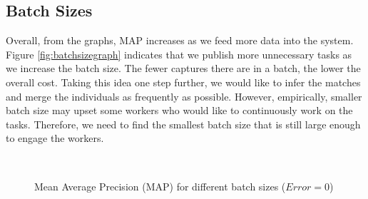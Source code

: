\subsection{Batch Sizes} %
\label{sub:batch_sizes_res}

Overall, from the graphs, MAP increases as we feed more data into the system.
Figure \ref{fig:batchsizegraph} indicates that we publish more unnecessary
tasks as we increase the batch size. The fewer captures there are in a batch,
the lower the overall cost. Taking this idea one step further, we would like to
infer the matches and merge the individuals as frequently as possible. However,
empirically, smaller batch size may upset some workers who would like to
continuously work on the tasks. Therefore, we need to find the smallest batch
size that is still large enough to engage the workers.

\begin{figure}[h!]
  \centering
  \\
  \captionsetup{justification=centering}
  \caption{Mean Average Precision (MAP) for different batch sizes ($Error=0$)}
\end{figure}

